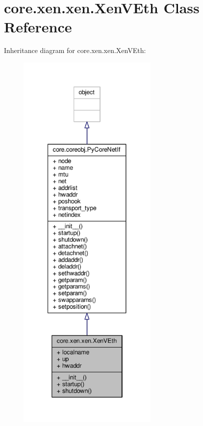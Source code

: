 \hypertarget{classcore_1_1xen_1_1xen_1_1_xen_v_eth}{\section{core.\+xen.\+xen.\+Xen\+V\+Eth Class Reference}
\label{classcore_1_1xen_1_1xen_1_1_xen_v_eth}
}


Inheritance diagram for core.\+xen.\+xen.\+Xen\+V\+Eth\+:
\nopagebreak
\begin{figure}[H]
\begin{center}
\leavevmode
\includegraphics[height=550pt]{classcore_1_1xen_1_1xen_1_1_xen_v_eth__inherit__graph}
\end{center}
\end{figure}


